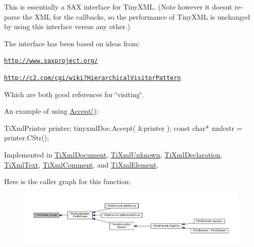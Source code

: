 This is essentially a S\+AX interface for Tiny\+X\+ML. (Note however it doesn\textquotesingle{}t re-\/parse the X\+ML for the callbacks, so the performance of Tiny\+X\+ML is unchanged by using this interface versus any other.)

The interface has been based on ideas from\+:


\begin{DoxyItemize}
\item \href{http://www.saxproject.org/}{\tt http\+://www.\+saxproject.\+org/}
\item \href{http://c2.com/cgi/wiki?HierarchicalVisitorPattern}{\tt http\+://c2.\+com/cgi/wiki?\+Hierarchical\+Visitor\+Pattern}
\end{DoxyItemize}

Which are both good references for \char`\"{}visiting\char`\"{}.

An example of using \hyperlink{class_ti_xml_node_acc0f88b7462c6cb73809d410a4f5bb86}{Accept()}\+: \begin{DoxyVerb}TiXmlPrinter printer;
tinyxmlDoc.Accept( &printer );
const char* xmlcstr = printer.CStr();
\end{DoxyVerb}
 

Implemented in \hyperlink{class_ti_xml_document_a3daab2f472418ef66315750202f762ae}{Ti\+Xml\+Document}, \hyperlink{class_ti_xml_unknown_a4e54d7482e05a837cf83c925cc683380}{Ti\+Xml\+Unknown}, \hyperlink{class_ti_xml_declaration_ab6a6b178161ba9abc2c35058de689864}{Ti\+Xml\+Declaration}, \hyperlink{class_ti_xml_text_a43b9954ebf679557fac1a4453f337b7c}{Ti\+Xml\+Text}, \hyperlink{class_ti_xml_comment_a4382de0e50da973f11a23ea5852568bd}{Ti\+Xml\+Comment}, and \hyperlink{class_ti_xml_element_a31ab28cc3b892a69254391d6bbe08df3}{Ti\+Xml\+Element}.



Here is the caller graph for this function\+:\nopagebreak
\begin{figure}[H]
\begin{center}
\leavevmode
\includegraphics[width=350pt]{class_ti_xml_node_acc0f88b7462c6cb73809d410a4f5bb86_icgraph}
\end{center}
\end{figure}


